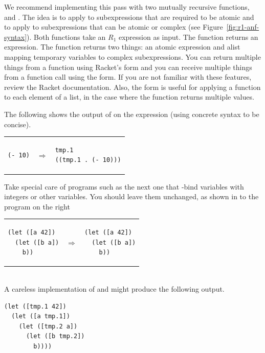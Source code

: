 \documentclass[11pt]{book}
\begin{document}
We recommend implementing this pass with two mutually recursive
functions,  and . The idea is to apply
 to subexpressions that are required to be atomic and
to apply  to subexpressions that can be atomic or
complex (see Figure~\ref{fig:r1-anf-syntax}).  Both functions take an
$R_1$ expression as input.  The  function returns an
expression.  The  function returns two things: an
atomic expression and alist mapping temporary variables to complex
subexpressions. You can return multiple things from a function using
Racket's  form and you can receive multiple things from a
function call using the  form. If you are not
familiar with these features, review the Racket documentation.  Also,
the  form is useful for applying a function to each
element of a list, in the case where the function returns multiple
values.

The following shows the output of  on the expression
 (using concrete syntax to be concise).

\begin{tabular}{lll}
\begin{minipage}{0.4\textwidth}
\begin{lstlisting}
(- 10)
\end{lstlisting}
\end{minipage}
&
$\Rightarrow$
&
\begin{minipage}{0.4\textwidth}
\begin{lstlisting}
tmp.1
((tmp.1 . (- 10)))
\end{lstlisting}
\end{minipage}
\end{tabular}

Take special care of programs such as the next one that -bind
variables with integers or other variables. You should leave them
unchanged, as shown in to the program on the right \\
\begin{tabular}{lll}
\begin{minipage}{0.4\textwidth}
\begin{lstlisting}
(let ([a 42])
  (let ([b a])
    b))
\end{lstlisting}
\end{minipage}
&
$\Rightarrow$
&
\begin{minipage}{0.4\textwidth}
\begin{lstlisting}
(let ([a 42])
  (let ([b a])
    b))
\end{lstlisting}
\end{minipage}
\end{tabular} \\
A careless implementation of  and  might
produce the following output.\\
\begin{minipage}{0.4\textwidth}
\begin{lstlisting}
(let ([tmp.1 42])
  (let ([a tmp.1])
    (let ([tmp.2 a])
      (let ([b tmp.2])
        b))))
\end{lstlisting}
\end{minipage}
\end{document}
